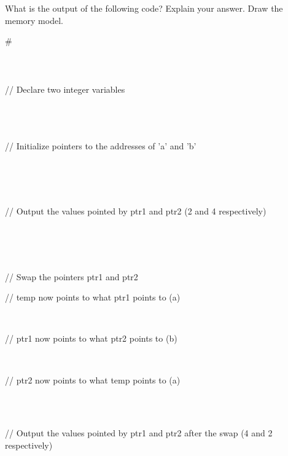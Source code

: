 
	\item \text[5pts] What is the output of the following code? Explain your answer. Draw the memory model.
	\begin{tcolorbox} [colback=white, colframe=black, width=6.7in, arc=0mm, boxrule=1pt]
	\text 
\#\\
\\
 \\
\code{\{}\\
    // Declare two integer variables\\
  \\
  \\\\
\begin{Solution}
  // Initialize pointers to the addresses of 'a' and 'b'\\
\end{Solution} \\
  \\\\
\begin{Solution}
  // Output the values pointed by ptr1 and ptr2 (2 and 4 respectively)\\
\end{Solution}
  \\
  \\\\
\begin{Solution}
    // Swap the pointers ptr1 and ptr2\\
\end{Solution}
  \begin{Solution}// temp now points to what ptr1 points to (a) \end{Solution}\\
         \begin{Solution}// ptr1 now points to what ptr2 points to (b) \end{Solution}\\
        \begin{Solution}// ptr2 now points to what temp points to (a) \end{Solution} \\\\
\begin{Solution}
  // Output the values pointed by ptr1 and ptr2 after the swap (4 and 2 respectively)\\
\end{Solution}
  \\
  \\\\
   \\
\code{\}}
	\end{tcolorbox}
